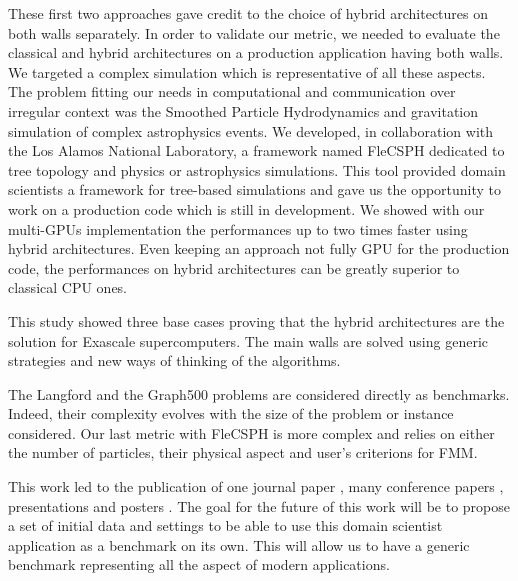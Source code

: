 These first two approaches gave credit to the choice of hybrid architectures on both walls separately. 
In order to validate our metric, we needed to evaluate the classical and hybrid architectures on a production application having both walls. 
We targeted a complex simulation which is representative of all these aspects. 
The problem fitting our needs in computational and communication over irregular context was the Smoothed Particle Hydrodynamics and gravitation simulation of complex astrophysics events. 
We developed, in collaboration with the Los Alamos National Laboratory, a framework named FleCSPH dedicated to tree topology and physics or astrophysics simulations. 
This tool provided domain scientists a framework for tree-based simulations and gave us the opportunity to work on a production code which is still in development. 
We showed with our multi-GPUs implementation the performances up to two times faster using hybrid architectures. 
Even keeping an approach not fully GPU for the production code, the performances on hybrid architectures can be greatly superior to classical CPU ones. 

This study showed three base cases proving that the hybrid architectures are the solution for Exascale supercomputers.
The main walls are solved using generic strategies and new ways of thinking of the algorithms. 

The Langford and the Graph500 problems are considered directly as benchmarks.
Indeed, their complexity evolves with the size of the problem or instance considered.  
Our last metric with FleCSPH is more complex and relies on either the number of particles, their physical aspect and user's criterions for FMM.

This work led to the publication of one journal paper \cite{krajecki2016many}, many conference papers \cite{krajecki2016bfs,loiseau2018Flecsphg,loiseau2018CARLA,loiseau2018Flecsphg,loiseau2018CARLA}, presentations and posters \cite{deleau2014towards,j2016resolution,jaillet2014Langford,loiseau2015parcours,loiseau2015GTC,debrye20162HOT,loiseau2017SC}.
The goal for the future of this work will be to propose a set of initial data and settings to be able to use this domain scientist application as a benchmark on its own.
This will allow us to have a generic benchmark representing all the aspect of modern applications.\\

